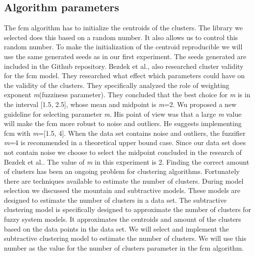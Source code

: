 \documentclass[../../main]{subfiles}
\begin{document}
\subsection{Algorithm parameters}
The \acrshort{fcm} algorithm has to initialize the centroids of the clusters.
The library we selected does this based on a random number.
It also allows us to control this random number.
To make the initialization of the centroid reproducible we will use the same generated seeds as in our first experiment.
The seeds generated are included in the Github repository\cite{rbasarat-repo}.
\newline
Bezdek et al., also researched cluster validity for the \acrshort{fcm} model\cite{Bezdek1995OnModel}.
They researched what effect which parameters could have on the validity of the clusters.
They specifically analyzed the role of weighting exponent \textit{m}(fuzziness parameter).
They concluded that the best choice for \textit{m} is in the interval [1.5, 2.5], whose mean and midpoint is \textit{m}=2.
Wu proposed a new guideline for selecting parameter \textit{m}\cite{Wu2012}.
His point of view was that a large \textit{m} value will make the \acrlong{fcm} more robust to noise and outliers.
He suggests implementing \acrlong{fcm} with \textit{m}=[1.5, 4].
When the data set contains noise and outliers, the fuzzifier \textit{m}=4 is recommended in a theoretical upper bound case.
Since our data set does not contain noise we choose to select the midpoint concluded in the research of Bezdek et al.\cite{Bezdek1995OnModel}.
The value of \textit{m} in this experiment is 2.
\newline
Finding the correct amount of clusters has been an ongoing problem for clustering algorithms\cite{Du2010Clustering:Approach}.
Fortunately there are techniques available to estimate the number of clusters.
During model selection we discussed the mountain and subtractive models. 
These models are designed to estimate the number of clusters in a data set.
The subtractive clustering model is specifically designed to approximate the number of clusters for fuzzy system models\cite{Chiu1994FuzzyEstimation}.
It approximates the centroids and amount of the clusters based on the data points in the data set\cite{Chiu1994FuzzyEstimation}.
We will select and implement the subtractive clustering model to estimate the number of clusters.
We will use this number as the value for the number of clusters parameter in the \acrshort{fcm} algorithm.
\end{document}
